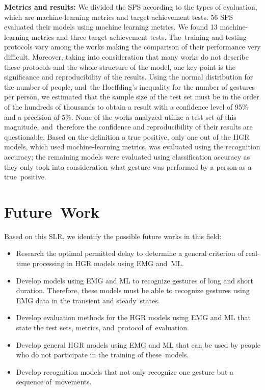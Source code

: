 \documentclass[sensors,review,accept,moreauthors,pdftex]{Definitions/mdpi}
\begin{document}
\textbf{Metrics and results:} We divided the SPS according to the types of evaluation, which are machine-learning metrics and target achievement tests. 56 SPS evaluated their models using machine learning metrics. We found 13 machine-learning metrics and three target achievement tests. The~training and testing protocols vary among the works making the comparison of their performance very difficult. Moreover, taking into consideration that many works do not describe these protocols and the whole structure of the model, one key point is the significance and reproducibility of the results. Using the normal distribution for the number of people, and~the Hoeffding's inequality for the number of gestures per person, we estimated that the sample size of the test set must be in the order of the hundreds of thousands to obtain a result with a confidence level of 95\% and a precision of 5\%. None of the works analyzed utilize a test set of this magnitude, and~therefore the confidence and reproducibility of their results are questionable. Based on the definition a true positive, only one out of the HGR models, which used machine-learning metrics, was evaluated using the recognition accuracy; the remaining models were evaluated using classification accuracy as they only took into consideration what gesture was performed by a person as a true~positive. 






\section{Future~Work} \label{future}

Based on this SLR, we identify the possible future works in this field:

\begin{itemize}
	\item Research the optimal permitted delay to determine a general criterion of real-time processing in HGR models using EMG and~ML.
	
	
	
	\item Develop models using EMG and ML to recognize gestures of long and short duration. Therefore, these models must be able to recognize gestures using EMG data in the transient and steady~states.
	
	
	
	
	\item Develop evaluation methods for the HGR models using EMG and ML that state the test sets, metrics, and~protocol of~evaluation.
	
	\item Develop general HGR models using EMG and ML that can be used by people who do not participate in the training of these~models.
	
	\item Develop recognition models that not only recognize one gesture but a sequence of~movements.
	
	
	
\end{itemize}
\end{document}
